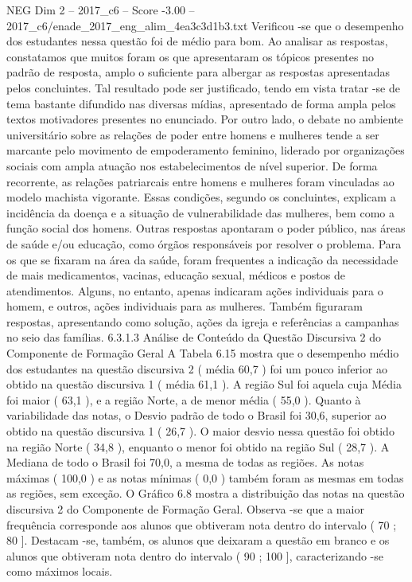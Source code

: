 \begin{textsample}{NEG Dim 2 – 2017\_c6 – Score -3.00 – 2017\_c6/enade\_2017\_eng\_alim\_4ea3c3d1b3.txt}
Verificou -se que o desempenho dos estudantes nessa questão foi de médio para bom.
Ao analisar as respostas, constatamos que muitos foram os que apresentaram os tópicos presentes no padrão de resposta, amplo o suficiente para albergar as respostas apresentadas pelos concluintes.
Tal resultado pode ser justificado, tendo em vista tratar -se de tema bastante difundido nas diversas mídias, apresentado de forma ampla pelos textos motivadores presentes no enunciado.
Por outro lado, o debate no ambiente universitário sobre as relações de poder entre homens e mulheres tende a ser marcante pelo movimento de empoderamento feminino, liderado por organizações sociais com ampla atuação nos estabelecimentos de nível superior.
De forma recorrente, as relações patriarcais entre homens e mulheres foram vinculadas ao modelo machista vigorante.
Essas condições, segundo os concluintes, explicam a incidência da doença e a situação de vulnerabilidade das mulheres, bem como a função social dos homens.
Outras respostas apontaram o poder público, nas áreas de saúde e/ou educação, como órgãos responsáveis por resolver o problema.
Para os que se fixaram na área da saúde, foram frequentes a indicação da necessidade de mais medicamentos, vacinas, educação sexual, médicos e postos de atendimentos.
Alguns, no entanto, apenas indicaram ações individuais para o homem, e outros, ações individuais para as mulheres.
Também figuraram respostas, apresentando como solução, ações da igreja e referências a campanhas no seio das famílias. 6.3.1.3 Análise de Conteúdo da Questão Discursiva 2 do Componente de Formação Geral A Tabela 6.15 mostra que o desempenho médio dos estudantes na questão discursiva 2 ( média 60,7 ) foi um pouco inferior ao obtido na questão discursiva 1 ( média 61,1 ).
A região Sul foi aquela cuja Média foi maior ( 63,1 ), e a região Norte, a de menor média ( 55,0 ).
Quanto à variabilidade das notas, o Desvio padrão de todo o Brasil foi 30,6, superior ao obtido na questão discursiva 1 ( 26,7 ).
O maior desvio nessa questão foi obtido na região Norte ( 34,8 ), enquanto o menor foi obtido na região Sul ( 28,7 ).
A Mediana de todo o Brasil foi 70,0, a mesma de todas as regiões.
As notas máximas ( 100,0 ) e as notas mínimas ( 0,0 ) também foram as mesmas em todas as regiões, sem exceção.
O Gráfico 6.8 mostra a distribuição das notas na questão discursiva 2 do Componente de Formação Geral.
Observa -se que a maior frequência corresponde aos alunos que obtiveram nota dentro do intervalo ( 70 ; 80 ].
Destacam -se, também, os alunos que deixaram a questão em branco e os alunos que obtiveram nota dentro do intervalo ( 90 ; 100 ], caracterizando -se como máximos locais.

\end{textsample}
